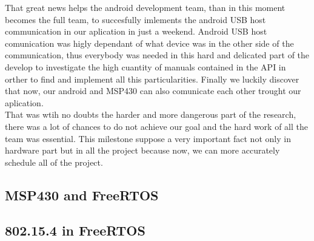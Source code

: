 		That great news helps the android development team, than in this moment becomes the full team, to succesfully imlements the android USB host communication in our aplication in just a weekend. Android USB host comunication was higly dependant of what device was in the other side of the communication, thus everybody was needed in this hard and delicated part of the develop to investigate the high cuantity of manuals contained in the API in orther to find and implement all this particularities. Finally we luckily discover that now, our android and MSP430 can also comunicate each other trought our aplication. \\

		That was wtih no doubts the harder and more dangerous part of the research, there was a lot of chances to do not achieve our goal and the hard work of all the team was essential. This milestone suppose a very important fact not only in hardware part but in all the project because now, we can more accurately schedule all of the project. \\


		\subsection{MSP430 and FreeRTOS}	
		
	
		\subsection{802.15.4 in FreeRTOS}

